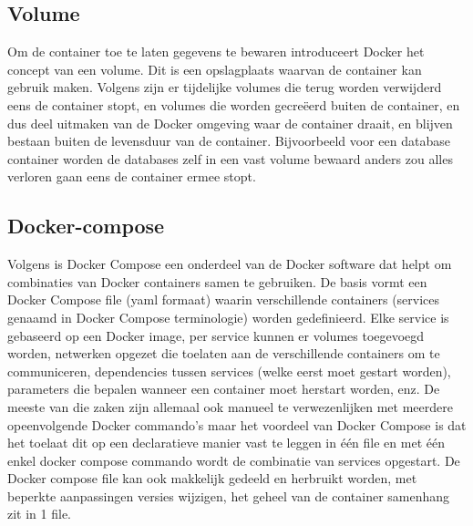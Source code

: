 \subsection{Volume}
Om de container toe te laten gegevens te bewaren introduceert Docker het concept van een volume. Dit is een opslagplaats waarvan de container kan gebruik maken. Volgens  \textcite{Frieze2022} zijn er tijdelijke volumes die terug worden verwijderd eens de container stopt, en volumes die worden gecreëerd buiten de container, en dus deel uitmaken van de Docker omgeving waar de container draait, en blijven bestaan buiten de levensduur van de container.
\newline
Bijvoorbeeld voor een database container worden de databases zelf in een vast volume bewaard anders zou alles verloren gaan eens de container ermee stopt.

\subsection{Docker-compose}
Volgens \textcite{Docker2023} is Docker Compose een onderdeel van de Docker software dat helpt om combinaties van Docker containers samen te gebruiken. De basis vormt een Docker Compose file (yaml formaat) waarin verschillende containers (services genaamd in Docker Compose terminologie) worden gedefinieerd. Elke service is gebaseerd op een Docker image, per service kunnen er volumes toegevoegd worden, netwerken opgezet die toelaten aan de verschillende containers om te communiceren, dependencies tussen services (welke eerst moet gestart worden), parameters die bepalen wanneer een container moet herstart worden, enz.
\newline
\newline
De meeste van die zaken zijn allemaal ook manueel te verwezenlijken met meerdere opeenvolgende Docker commando's maar het voordeel van Docker Compose is dat het toelaat dit op een declaratieve manier vast te leggen in één file en met één enkel docker compose commando wordt de combinatie van services opgestart. De Docker compose file kan ook makkelijk gedeeld en herbruikt worden, met beperkte aanpassingen versies wijzigen, het geheel van de container samenhang zit in 1 file.
\newline
\newline

